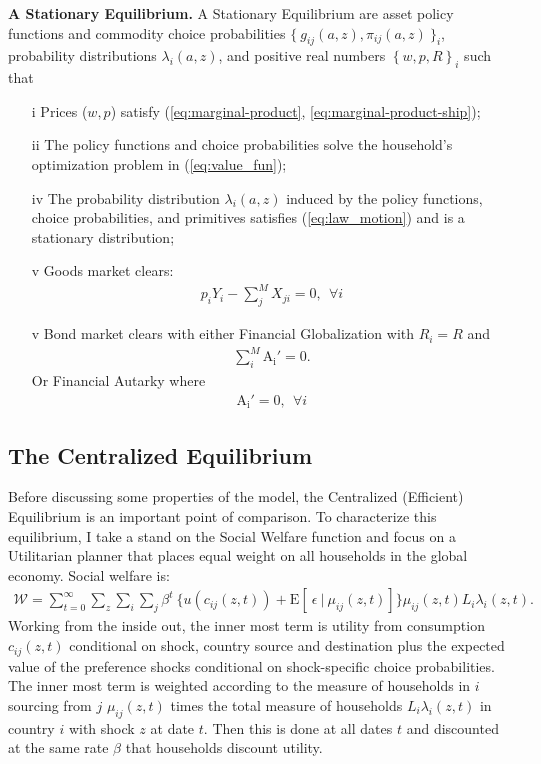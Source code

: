\documentclass[12pt,pdftex]{article}
\begin{document}
\begin{onehalfspacing}
\textbf{A Stationary Equilibrium.} A Stationary Equilibrium are asset policy functions and commodity choice probabilities $\{\  g_{ij}(a, z), \pi_{ij}(a, z) \ \}_{i}$, probability distributions $\lambda_i(a, z)$, and positive real numbers $\left \{w, p, R\right \}_{i}$ such that
\begin{itemize}
\vspace{-.4cm}
\item[i]  Prices ($w, p$) satisfy (\ref{eq:marginal-product}, \ref{eq:marginal-product-ship});
\item[ii] The policy functions and choice probabilities solve the household's optimization problem in (\ref{eq:value_fun});
\item[iv] The probability distribution $\lambda_i(a, z)$ induced by the policy functions, choice probabilities, and primitives satisfies (\ref{eq:law_motion}) and is a stationary distribution;
\item[v] Goods market clears:
\begin{align}
p_{i} Y_{i} - \sum_{j}^{M}  X_{ji} = 0, \ \ \forall i
\end{align}
\item[v] Bond market clears with either Financial Globalization with $R_i = R$ and
\begin{align}
\sum_{i}^{M} \mathrm{A_i'} = 0.
\label{eq:fg-condition}
\end{align}
Or Financial Autarky where
\begin{align}
\mathrm{A_i'} = 0, \ \ \forall i
\label{eq:fa-condition}
\end{align}
\end{itemize}

\subsection{The Centralized Equilibrium}

Before discussing some properties of the model, the Centralized (Efficient) Equilibrium is an important point of comparison. To characterize this equilibrium, I take a stand on the Social Welfare function and focus on a Utilitarian planner that places equal weight on all households in the global economy. Social welfare is:
\begin{align}
\mathcal{W} =\sum_{t=0}^{\infty}  \sum\limits_{z} \sum_{i} \sum_{j} \beta^{t} \  \bigg \{  u(c_{ij}(z, t) ) + \mathrm{E}[ \ \epsilon \ | \ \mu_{ij}(z,t) ] \bigg \}\mu_{ij}(z,t) L_{i} \lambda_{i}(z, t).
\label{eq:sp-social_welfare}
\end{align}
Working from the inside out, the inner most term is utility from consumption $c_{ij}(z, t)$ conditional on shock, country source and destination plus the expected value of the preference shocks conditional on shock-specific choice probabilities. The inner most term is weighted according to the measure of households in $i$ sourcing from $j$ $\mu_{ij}(z,t)$ times the total measure of households $L_{i}\lambda_{i}(z, t)$ in country $i$ with shock $z$ at date $t$. Then this is done at all dates $t$ and discounted at the same rate $\beta$ that households discount utility.


\end{onehalfspacing}
\end{document}
